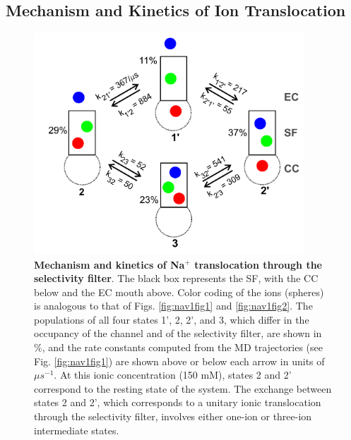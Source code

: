 \begin{refsection}
\subsection{Mechanism and Kinetics of Ion Translocation}

\begin{figure}[!htb]
\centering
\includegraphics[width=0.9\textwidth]{nav1/Nav1Fig4}
\caption[Mechanism and kinetics of Na$^+$ translocation through the selectivity filter]{\textbf{Mechanism and kinetics of Na$^+$ translocation through the selectivity filter}. The black box represents the SF, with the CC below and the EC mouth above.  Color coding of the ions (spheres) is analogous to that of Figs. \ref{fig:nav1fig1} and \ref{fig:nav1fig2}.  The populations of all four states 1', 2, 2', and 3, which differ in the occupancy of the channel and of the selectivity filter, are shown in \%, and the rate constants computed from the MD trajectories (see Fig. \ref{fig:nav1fig1}) are shown above or below each arrow in units of $\mu s^{-1}$.  At this ionic concentration (150 mM), states 2 and 2' correspond to the resting state of the system. The exchange between states 2 and 2', which corresponds to a unitary ionic translocation through the selectivity filter, involves either one-ion or three-ion intermediate states.}
\label{fig:nav1fig3}
\end{figure}


\end{refsection}
